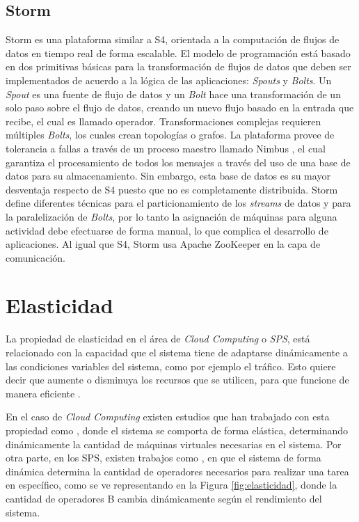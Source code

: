 \subsection{Storm}
Storm \citep{bookstorm} es una plataforma similar a S4, orientada a la computación de flujos de datos en tiempo real de forma escalable. El modelo de programación está basado en dos primitivas básicas para la transformación de flujos de datos que deben ser implementados de acuerdo a la lógica de las aplicaciones: \textit{Spouts} y \textit{Bolts}. Un \textit{Spout} es una fuente de flujo de datos y un \textit{Bolt} hace una transformación de un solo paso sobre el flujo de datos, creando un nuevo flujo basado en la entrada que recibe, el cual es llamado operador. Transformaciones complejas requieren múltiples \textit{Bolts}, los cuales crean topologías o grafos. La plataforma provee de tolerancia a fallas a través de un proceso maestro llamado Nimbus \citep{MiaoYJ14}, el cual garantiza el procesamiento de todos los mensajes a través del uso de una base de datos para su almacenamiento. Sin embargo, esta base de datos es su mayor desventaja respecto de S4 puesto que no es completamente distribuida. Storm define diferentes técnicas para el particionamiento de los \textit{streams} de datos y para la paralelización de \textit{Bolts}, por lo tanto la asignación de máquinas para alguna actividad debe efectuarse de forma manual, lo que complica el desarrollo de aplicaciones. Al igual que S4, Storm usa Apache ZooKeeper \citep{HuntKJR10} en la capa de comunicación.

\section{Elasticidad}
\label{sec:elasticidad}

La propiedad de elasticidad en el área de \textit{Cloud Computing} o \textit{SPS}, está relacionado con la capacidad que el sistema tiene de adaptarse dinámicamente a las condiciones variables del sistema, como por ejemplo el tráfico. Esto quiere decir que aumente o disminuya los recursos que se utilicen, para que funcione de manera eficiente \citep{kelly2014elasticity}.

En el caso de \textit{Cloud Computing} existen estudios que han trabajado con esta propiedad como \citep{GongGW10, NguyenSGSW13, LehrigEB15}, donde el sistema se comporta de forma elástica, determinando dinámicamente la cantidad de máquinas virtuales necesarias en el sistema. Por otra parte, en los SPS, existen trabajos como \citep{GedikSHW14, IshiiS11, SchneiderAGBW09, MadsenTZ14, GulisanoJPSV12}, en que el sistema de forma dinámica determina la cantidad de operadores necesarios para realizar una tarea en específico, como se ve representando en la Figura \ref{fig:elasticidad}, donde la cantidad de operadores B cambia dinámicamente según el rendimiento del sistema.

